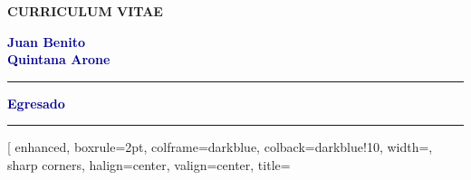 \documentclass[a4paper,11pt]{article}
\begin{document}
	
		\begin{tcolorbox}[
			enhanced,
			boxrule=2pt,
			colframe=darkblue,
			colback=darkblue,
			width=\linewidth,
			sharp corners,
			halign=center, %
			valign=center, %
			]
			\color{white} \Large{\textbf{CURRICULUM VITAE}}
		\end{tcolorbox}
	
	
	\begin{multicols}{2}[\columnsep=0.4cm] %
			
		\begin{center}
			\begin{minipage}{0.4\textwidth}
				\centering
				\begin{center}
				\end{center}
				\textcolor{darkblue}{\Large \textbf{Juan Benito}\\ \textbf{Quintana Arone}} \\
				\textcolor{darkblue}{\rule{\linewidth}{2pt}} %
				\vspace{0.3mm}
				\textcolor{darkblue}{\large \textbf{Egresado}}
				\vspace{0.3mm}
				\textcolor{darkblue}{\rule{\linewidth}{2pt}} %
			\end{minipage}
			
		\end{center}
		

			\begin{center}
				\begin{minipage}{0.4\textwidth}
					
					\begin{tcolorbox}[
						enhanced,
						boxrule=2pt,
						colframe=darkblue,
						colback=darkblue!10,
						width=\linewidth,
						sharp corners,
						halign=center,  %
						valign=center,
						title=\begin{center}

\end{center}
\end{tcolorbox}
\end{minipage}
\end{center}
\end{multicols}
\end{document}
